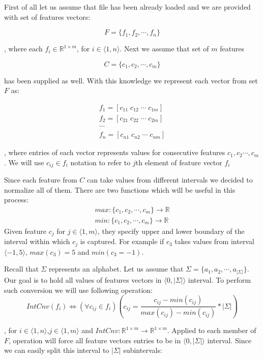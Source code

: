 \documentclass{mini}
\begin{document}
First of all let us assume that file has been already loaded and we are provided with set of features vectors: 

\[ F = \{ f_1 , f_2, \cdots , f_n \} \]

, where each $f_i \in \mathbb{R}^{1 \times m}$, for $i \in \langle 1,n \rangle$.
Next we assume that set of $m$ features 

\[ C = \{ c_1 , c_2, \cdots , c_m \}\] 

has been supplied as well. With this knowledge we represent each vector from set $F$ as: 

\begin{align*}
    f_1 = [ c_{11} \; c_{12} \; \cdots \; c_{1m}] \\
    f_2 = [ c_{21} \; c_{22} \; \cdots \; c_{2m}] \\
    \cdots \\
    f_n = [ c_{n1} \; c_{n2} \; \cdots \; c_{nm}] 
\end{align*}

, where entries of each vector represents values for consecutive features $c_1, c_2 \cdots , c_m$. We will use $c_{ij }\in f_i$ notation to refer to $j$th element of feature vector $f_i$ 

Since each feature from $C$ can take values from different intervals we decided to normalize all of them. There are two functions which will be useful in this process:
\begin{align*}
    max : \{c_1, c_2, \cdots, c_m\} \rightarrow \mathbb{R} \\
    min : \{c_1, c_2, \cdots, c_m\} \rightarrow \mathbb{R}
\end{align*}
Given feature $c_j$ for $j \in \langle 1, m \rangle$, they specify upper and lower boundary of the interval within which $c_j$ is captured. For example if $c_3$ takes values from interval $\langle -1 , 5 \rangle$, $max(c_3) = 5$ and $min(c_3 = -1)$.

Recall that $\Sigma$ represents an alphabet. Let us assume that $\Sigma = \{a_1 , a_2, \cdots, a_{|\Sigma|}\}$. Our goal is to hold all values of features vectors in $\langle 0 , |\Sigma| \rangle$ interval. To perform such conversion we will use following operation:
\begin{equation}
    IntCnv(f_i) \Leftrightarrow (\forall{c_{ij} \in f_i})(c_{ij} =  \frac{c_{ij} - min(c_{ij})}{max(c_{ij}) - min(c_{ij})} * |\Sigma|)
\end{equation}

, for $i \in \langle 1, n \rangle$,$j \in \langle 1, m \rangle$ and $IntCnv : \mathbb{R}^{1 \times m} \rightarrow \mathbb{R}^{1 \times m}$. Applied to each member of $F$, operation will force all feature vectors entries to be in $\langle 0 , |\Sigma| \rangle$ interval. Since we can easily split this interval to $|\Sigma|$ subintervals:
\end{document}
